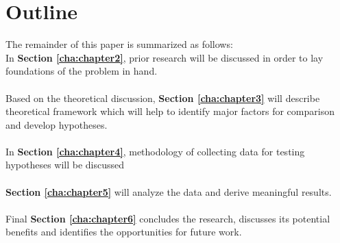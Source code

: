 \section{Outline\label{sec:outline}}

The remainder of this paper is summarized as follows:
\\
In \textbf{Section \ref{cha:chapter2}}, prior research will be discussed
in order to lay foundations of the problem in hand.
\\
\\
Based on the theoretical discussion, \textbf{Section \ref{cha:chapter3}} will describe theoretical framework which will help to identify major factors for comparison and develop hypotheses. 
\\
\\
In \textbf{Section \ref{cha:chapter4}}, methodology of collecting data for testing hypotheses will be
discussed
\\
\\
\textbf{Section \ref{cha:chapter5}} will analyze the data and derive meaningful results.
\\
\\
Final \textbf{Section \ref{cha:chapter6}} concludes the research, discusses its potential benefits and identifies the opportunities for future
work.
